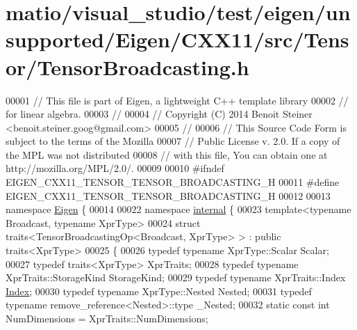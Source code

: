 \hypertarget{matio_2visual__studio_2test_2eigen_2unsupported_2_eigen_2_c_x_x11_2src_2_tensor_2_tensor_broadcasting_8h_source}{}\section{matio/visual\+\_\+studio/test/eigen/unsupported/\+Eigen/\+C\+X\+X11/src/\+Tensor/\+Tensor\+Broadcasting.h}
\label{matio_2visual__studio_2test_2eigen_2unsupported_2_eigen_2_c_x_x11_2src_2_tensor_2_tensor_broadcasting_8h_source}

\begin{DoxyCode}
00001 \textcolor{comment}{// This file is part of Eigen, a lightweight C++ template library}
00002 \textcolor{comment}{// for linear algebra.}
00003 \textcolor{comment}{//}
00004 \textcolor{comment}{// Copyright (C) 2014 Benoit Steiner <benoit.steiner.goog@gmail.com>}
00005 \textcolor{comment}{//}
00006 \textcolor{comment}{// This Source Code Form is subject to the terms of the Mozilla}
00007 \textcolor{comment}{// Public License v. 2.0. If a copy of the MPL was not distributed}
00008 \textcolor{comment}{// with this file, You can obtain one at http://mozilla.org/MPL/2.0/.}
00009 
00010 \textcolor{preprocessor}{#ifndef EIGEN\_CXX11\_TENSOR\_TENSOR\_BROADCASTING\_H}
00011 \textcolor{preprocessor}{#define EIGEN\_CXX11\_TENSOR\_TENSOR\_BROADCASTING\_H}
00012 
00013 \textcolor{keyword}{namespace }\hyperlink{namespace_eigen}{Eigen} \{
00014 
00022 \textcolor{keyword}{namespace }\hyperlink{namespaceinternal}{internal} \{
00023 \textcolor{keyword}{template}<\textcolor{keyword}{typename} Broadcast, \textcolor{keyword}{typename} XprType>
00024 \textcolor{keyword}{struct }traits<TensorBroadcastingOp<Broadcast, XprType> > : \textcolor{keyword}{public} traits<XprType>
00025 \{
00026   \textcolor{keyword}{typedef} \textcolor{keyword}{typename} XprType::Scalar Scalar;
00027   \textcolor{keyword}{typedef} traits<XprType> XprTraits;
00028   \textcolor{keyword}{typedef} \textcolor{keyword}{typename} XprTraits::StorageKind StorageKind;
00029   \textcolor{keyword}{typedef} \textcolor{keyword}{typename} XprTraits::Index \hyperlink{namespace_eigen_a62e77e0933482dafde8fe197d9a2cfde}{Index};
00030   \textcolor{keyword}{typedef} \textcolor{keyword}{typename} XprType::Nested Nested;
00031   \textcolor{keyword}{typedef} \textcolor{keyword}{typename} remove\_reference<Nested>::type \_Nested;
00032   \textcolor{keyword}{static} \textcolor{keyword}{const} \textcolor{keywordtype}{int} NumDimensions = XprTraits::NumDimensions;

\end{DoxyCode}
